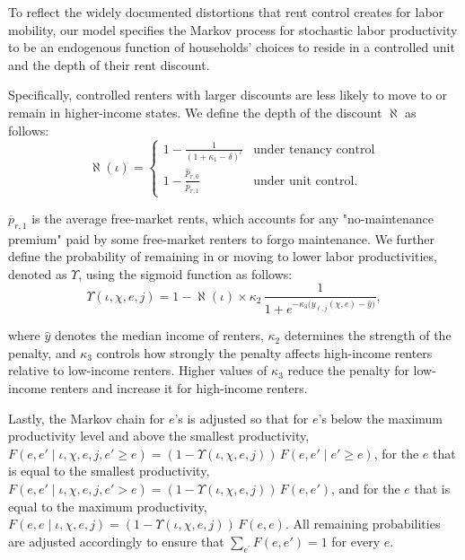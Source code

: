 \documentclass[parskip=full]{article}
\begin{document}
To reflect the widely documented distortions that rent control creates for labor mobility, our model specifies the Markov process for stochastic labor productivity to be an endogenous function of households’ choices to reside in a controlled unit and the depth of their rent discount.

Specifically, controlled renters with larger discounts are less likely to move to or remain in higher-income states. We define the depth of the discount $\aleph$ as follows:
\begin{equation}\label{eq:discount}
\aleph(\iota)=\begin{cases}
1-\frac{1}{\left(1+\kappa_1-\delta \right)^{\iota}} & \text{under tenancy control} \\[8pt]
1-\frac{\hat{p}_{r,0}}{\overline{p}_{r,1}} & \text{under unit control}.
\end{cases}
\end{equation}

\noindent $\overline{p}_{r,1}$ is the average free-market rents, which accounts for any "no-maintenance premium" paid by some free-market renters to forgo maintenance. We further define the probability of remaining in or moving to lower labor productivities, denoted as $\Upsilon$, using the sigmoid function as follows:
\begin{equation}\label{eq:penalty}
\Upsilon(\iota,\chi,e,j)=1-\aleph(\iota) \times  \kappa_2\,\frac{1}{1+e^{-\kappa_3\big( y_{\ell,j}(\chi,e)-\hat{y}\big)}},
\end{equation}

\noindent where $\hat{y}$ denotes the median income of renters, $\kappa_2$ determines the strength of the penalty, and $\kappa_3$ controls how strongly the penalty affects high-income renters relative to low-income renters. Higher values of $\kappa_3$ reduce the penalty for low-income renters and increase it for high-income renters.

Lastly, the Markov chain for $e$'s is adjusted so that for $e$'s below the maximum productivity level and above the smallest productivity, $F(e,e'\mid\iota,\chi,e,j,e'\geq e)=(1-\Upsilon(\iota,\chi,e,j))\,F(e,e'\mid e'\geq e)$, for the $e$ that is equal to the smallest productivity, $F(e,e'\mid\iota,\chi,e,j,e'>e)=(1-\Upsilon(\iota,\chi,e,j))\,F(e,e')$, and for the $e$ that is equal to the maximum productivity, $F(e,e\mid\iota,\chi,e,j)=(1-\Upsilon(\iota,\chi,e,j))\,F(e,e)$. All remaining probabilities are adjusted accordingly to ensure that $\sum_{e^{'}} F(e,e')=1$ for every $e$.
\end{document}
